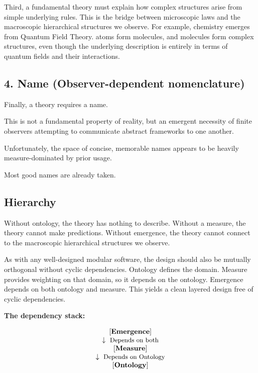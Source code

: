 Third, a fundamental theory must explain how complex structures arise from simple underlying rules.
This is the bridge between microscopic laws and the macroscopic hierarchical structures we observe.
For example, chemistry emerges from Quantum Field Theory.
atoms form molecules, and molecules form complex structures, even though the underlying description
is entirely in terms of quantum fields and their interactions.


\subsection*{4. Name (Observer-dependent nomenclature)}

Finally, a theory requires a name.

This is not a fundamental property of reality,
but an emergent necessity of finite observers attempting to communicate abstract frameworks to one another.

Unfortunately, the space of concise, memorable names appears to be heavily measure-dominated by prior usage.

Most good names are already taken.


\subsection*{Hierarchy}

Without ontology, the theory has nothing to describe. Without a measure, the theory cannot make predictions.
Without emergence, the theory cannot connect to the macroscopic hierarchical structures we observe.

As with any well-designed modular software, the design should also be mutually orthogonal without cyclic dependencies.
Ontology defines the domain. Measure provides weighting on that domain, so it depends on the ontology.
Emergence depends on both ontology and measure. This yields a clean layered design free of cyclic dependencies.

\textbf{The dependency stack:}

\[
\begin{array}{c}
\mathbf{[Emergence]} \\
\downarrow \ \text{\small{Depends on both}} \\
\mathbf{[Measure]} \\
\downarrow \ \text{\small{Depends on Ontology}} \\
\mathbf{[Ontology]} \\
\end{array}
\]

